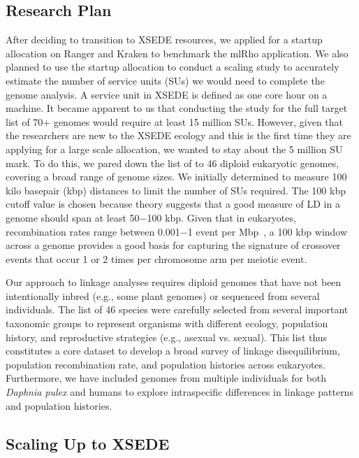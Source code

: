 \documentclass{sig-alternate}
\newcommand{\abhi}[1]{ {\textcolor{red} { ***Abhinav: #1 }}}
\newcommand{\abhi}[1]{ {}}
\begin{document}
\subsection{Research Plan}\label{sec:plan}


After deciding to transition to XSEDE resources, we applied for a startup allocation on Ranger and Kraken to
benchmark the mlRho application. We also planned to use the startup allocation to conduct a scaling study to
accurately estimate the number of service units (SUs) we would need to complete the genome analysis. A service
unit in XSEDE is defined as one core hour on a machine. It became apparent to us that conducting the study for
the full target list of 70+ genomes would require at least 15 million SUs. However, given that the researchers
are new to the XSEDE ecology and this is the first time they are applying for a large scale allocation, we
wanted to stay about the 5 million SU mark. To do this, we pared down the list of to 46 diploid eukaryotic
genomes, covering a broad range of genome sizes. We initially determined to measure 100 kilo basepair (kbp)
distances to limit the number of SUs required. The 100 kbp cutoff value is chosen because theory suggests that
a good measure of LD in a genome should span at least 50$-$100 kbp. Given that in eukaryotes, recombination
rates range between 0.001$-$1 event per Mbp~\cite{annurev-genom-082410-101412}, a 100 kbp window across a
genome provides a good basis for capturing the signature of crossover events that occur 1 or 2 times per
chromosome arm per meiotic event.

Our approach to linkage analyses requires diploid genomes that have not been intentionally inbred (e.g., some
plant genomes) or sequenced from several individuals. The list of 46 species were carefully selected from
several important taxonomic groups to represent organisms with different ecology, population history, and
reproductive strategies (e.g., asexual vs. sexual). This list thus constitutes a core dataset to develop a
broad survey of linkage disequilibrium, population recombination rate, and population histories across
eukaryotes. Furthermore, we have included genomes from multiple individuals for both {\it Daphnia pulex} and
humans to explore intraspecific differences in linkage patterns and population histories.

\subsection{Scaling Up to XSEDE}
\label{sec:tests}
\end{document}
